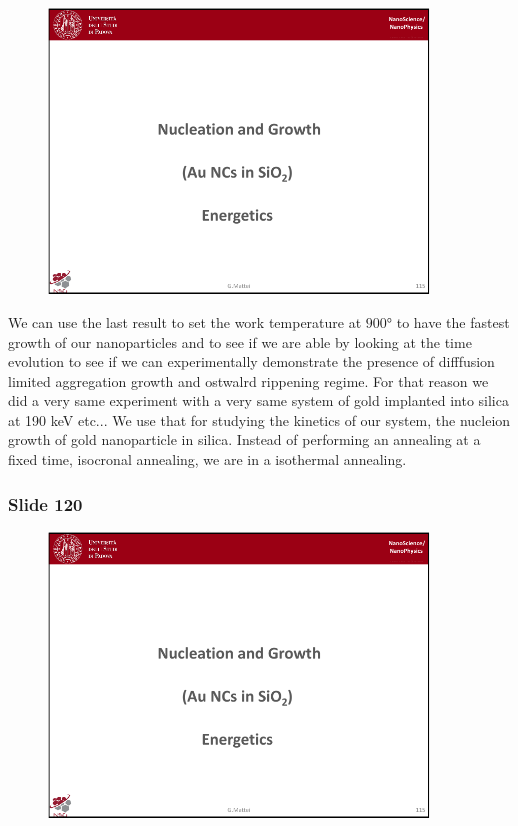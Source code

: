 \documentclass[../main/main.tex]{subfiles}
\begin{document}
\begin{figure}[h!]
\centering
\includegraphics[page=5,width=0.9\textwidth]{../lessons/pdf_file/8_lesson.pdf}
\end{figure}

We can use the last result to set the work temperature at \( 900° \) to have the fastest growth of our nanoparticles and to see if we are able by looking at the time evolution to see if we can experimentally demonstrate the presence of difffusion limited aggregation growth and ostwalrd rippening regime.
For that reason we did a very same experiment with a very same system of gold implanted into silica at 190 keV etc... We use that for studying the kinetics of our system, the nucleion growth of gold nanoparticle in silica. Instead of performing an annealing at a fixed time, isocronal annealing, we are in a isothermal annealing.

\newpage
\subsubsection{Slide 120}

\begin{figure}[h!]
\centering
\includegraphics[page=6,width=0.9\textwidth]{../lessons/pdf_file/8_lesson.pdf}
\end{figure}
\end{document}
